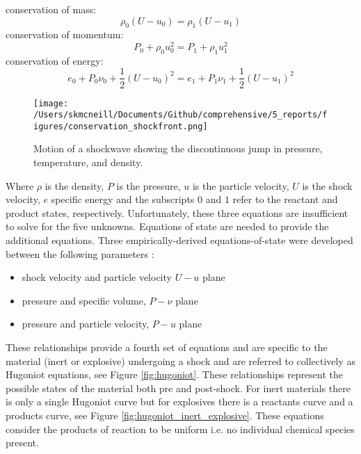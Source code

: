 \noindent
conservation of mass: 
\begin{equation}\label{eq:conservation_of_mass1}
\rho_0 (U - u_0) = \rho_1(U - u_1)
\end{equation}
conservation of momentum: 
\begin{equation}\label{eq:conservation_of_momentum}
P_0 + \rho_0 u_0^2 = P_1 + \rho_1 u_1^2
\end{equation}
conservation of energy: 
\begin{equation}\label{eq:conservation_of_energy}
e_0 + P_0\nu_0 + \frac{1}{2}\left(U-u_0\right)^2 = e_1 + P_1\nu_1 + \frac{1}{2}\left(U - u_1\right)^2
\end{equation}

\begin{figure}
  \begin{center}
   \texttt{[image: /Users/skmcneill/Documents/Github/comprehensive/5\_reports/figures/conservation\_shockfront.png]}
  \end{center}
  \caption{Motion of a shockwave showing the discontinuous jump in pressure, temperature, and density.}
\label{fig:sw_cons}
\end{figure}%

\noindent
Where $\rho$ is the density, $P$ is the pressure, $u$ is the particle velocity, $U$ is the shock velocity, $e$ specific energy and the subscripts $0$ and $1$ refer to the reactant and product states, respectively. Unfortunately, these three equations are insufficient to solve for the five unknowns.  Equations of state are needed to provide the additional equations.  Three empirically-derived equations-of-state were developed between the following parameters \cite{March1980}\cite{Cooper1996}:
\begin{itemize}
\item shock velocity and particle velocity $U-u$ plane
\item pressure and specific volume, $P-\nu$ plane
\item pressure and particle velocity, $P-u$ plane
\end{itemize}
These relationships provide a fourth set of equations and are specific to the material (inert or explosive) undergoing a shock and are referred to collectively as Hugoniot equations, see Figure \ref{fig:hugoniot}.  These relationships represent the possible states of the material both pre and post-shock.  For inert materials there is only a single Hugoniot curve but for explosives there is a reactants curve and a products curve, see Figure \ref{fig:hugoniot_inert_explosive}.  These equations consider the products of reaction to be uniform i.e. no individual chemical species present.

